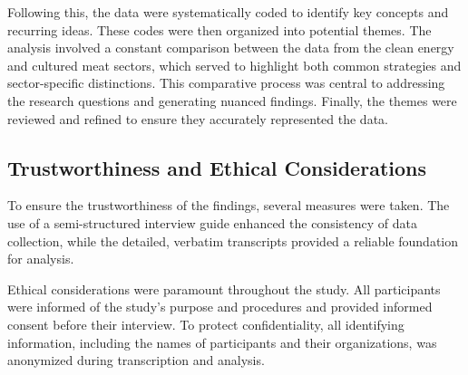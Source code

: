 Following this, the data were systematically coded to identify key concepts and recurring ideas. These codes were then organized into potential themes. The analysis involved a constant comparison between the data from the clean energy and cultured meat sectors, which served to highlight both common strategies and sector-specific distinctions. This comparative process was central to addressing the research questions and generating nuanced findings. Finally, the themes were reviewed and refined to ensure they accurately represented the data.

\subsection{Trustworthiness and Ethical Considerations}
To ensure the trustworthiness of the findings, several measures were taken. The use of a semi-structured interview guide enhanced the consistency of data collection, while the detailed, verbatim transcripts provided a reliable foundation for analysis.

Ethical considerations were paramount throughout the study. All participants were informed of the study's purpose and procedures and provided informed consent before their interview. To protect confidentiality, all identifying information, including the names of participants and their organizations, was anonymized during transcription and analysis.